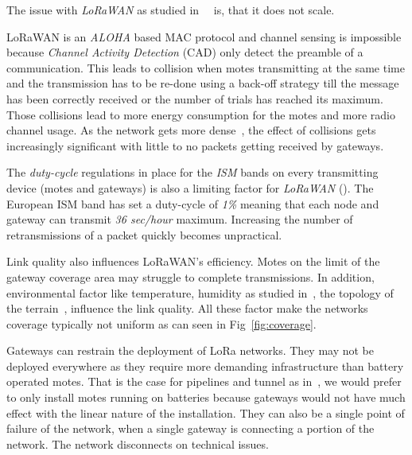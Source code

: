 

The issue with \emph{LoRaWAN} as studied 
in~\cite{8030482}~\cite{10.1145/2988287.2989163} is, that it does not scale. 

LoRaWAN is an \emph{ALOHA} based MAC protocol and channel sensing is impossible 
because \emph{Channel Activity Detection} (CAD) only detect the preamble of a 
communication. %
This leads to collision when motes transmitting at the same time and
the transmission has to be re-done using a back-off strategy till the message
has been correctly received or the number of trials has reached its maximum.
Those collisions lead to more energy consumption for the motes and more radio 
channel usage.
As the network gets more dense~\cite{8030482}, the effect of collisions gets
increasingly significant with little to no packets getting received by gateways.

The \emph{duty-cycle} regulations in place for the \emph{ISM} bands on every
transmitting device (motes and gateways) is also a limiting factor 
for \emph{LoRaWAN} (\cite{8030482}).
The European ISM band has set a duty-cycle of \emph{1\%} meaning that each node 
and gateway can transmit \emph{36 sec/hour} maximum. 
Increasing the number of retransmissions of a packet quickly becomes
unpractical.

Link quality also influences LoRaWAN's efficiency. 
Motes on the limit of the gateway coverage area may struggle to
complete transmissions. 
In addition, environmental factor like temperature, humidity as studied 
in~\cite{evaluation_of_the_reliability_of_lora}, the topology of the 
terrain~\cite{lorajambalaya}, influence the link quality.
All these factor make the networks coverage typically not uniform 
as can seen in Fig~\ref{fig:coverage}.

Gateways can restrain the deployment of LoRa networks.
They may not be deployed everywhere as they require more demanding infrastructure 
than battery operated motes.
That is the case for pipelines and tunnel as in~\cite{Abrardo_2019},
we would prefer to only install motes running on batteries because
gateways would not have much effect with the linear nature of the installation.
They can also be a single point of failure of the network, when a single
gateway is connecting a portion of the network. 
The network disconnects on technical issues.

